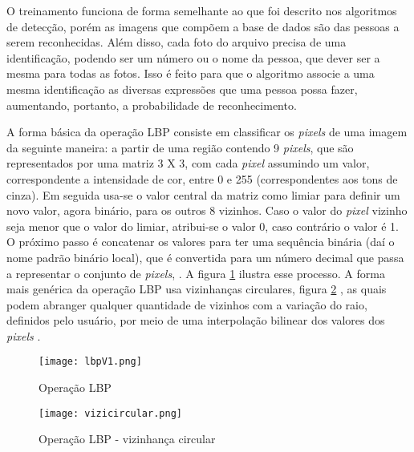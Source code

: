 O treinamento funciona de forma semelhante ao que foi descrito nos algoritmos de detecção, porém as imagens que compõem a base de dados são das pessoas a serem reconhecidas. Além disso, cada foto do arquivo precisa de uma identificação, podendo ser um número ou o nome da pessoa, que dever ser a mesma para todas as fotos. Isso é feito para que o algoritmo associe a uma mesma identificação as diversas expressões que uma pessoa possa fazer, aumentando, portanto, a probabilidade de reconhecimento.

A forma básica da operação LBP consiste em classificar os \textit{pixels} de uma imagem da seguinte maneira: a partir de uma região contendo 9 \textit{pixels}, que são representados por uma matriz 3 X 3, com cada \textit{pixel} assumindo um valor, correspondente a intensidade de cor, entre 0 e 255 (correspondentes aos tons de cinza). Em seguida usa-se o valor central da matriz como limiar para definir um novo valor, agora binário, para os outros 8 vizinhos. Caso o valor do \textit{pixel} vizinho seja menor que o valor do limiar, atribui-se o valor 0, caso contrário o valor é 1. O próximo passo é concatenar os valores para ter uma sequência binária (daí o nome padrão binário local), que é convertida para um número decimal que passa a representar o conjunto de \textit{pixels}, \citep{tdc2018}. A figura \ref{fig:figura6} ilustra esse processo. A forma mais genérica da operação LBP usa vizinhanças circulares, figura \ref{fig:figura7} , as quais podem abranger qualquer quantidade de vizinhos com a variação do raio, definidos pelo usuário, por meio de uma interpolação bilinear dos valores dos \textit{pixels} \citep{Timo2006}.

\begin{figure}[!ht]
	\centering
	\texttt{[image: lbpV1.png]}   
	\caption{Operação LBP}
	\label{fig:figura6}
\end{figure}

\begin{figure}[!ht]
	\centering
	\texttt{[image: vizicircular.png]}   
	\caption{Operação LBP - vizinhança circular}
	\label{fig:figura7}
\end{figure}

